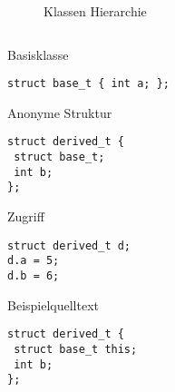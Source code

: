 \documentclass{article}
\newenvironment{code}{\captionsetup{type=listing}}{}
\begin{document}
\begin{figure}[h]
	\centering
{}
\caption{Klassen Hierarchie}
\label{fig:hierarchy}
\end{figure}


\inputminted{C}{code/employees/employee.h}





\begin{code}
\caption{Basisklasse}
\begin{verbatim}
struct base_t { int a; };
\end{verbatim}
\end{code}

\begin{code}
\caption{Anonyme Struktur}
\begin{verbatim}
struct derived_t {
 struct base_t;
 int b;
};
\end{verbatim}
\end{code}

\begin{code}
\caption{Zugriff}
\begin{verbatim}
struct derived_t d;
d.a = 5;
d.b = 6;
\end{verbatim}
\end{code}

\begin{code}
\caption{Beispielquelltext}
\begin{verbatim}
struct derived_t {
 struct base_t this;
 int b;
};
\end{verbatim}
\end{code}
\end{document}
